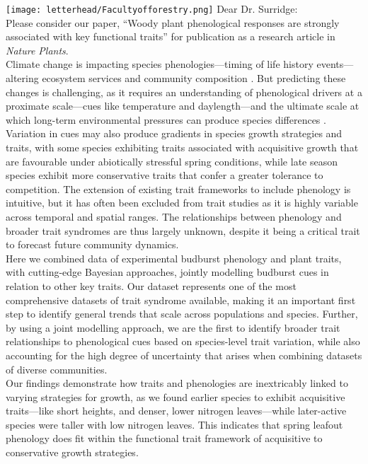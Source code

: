 \documentclass[11pt,a4paper]{article}
\begin{document}

\noindent \texttt{[image: letterhead/Facultyofforestry.png]}
\noindent Dear Dr. Surridge:
\vspace{1.5ex}\\
\noindent Please consider our paper, ``Woody plant phenological responses are strongly associated with key functional traits'' for publication as a research article in \emph{Nature Plants}. 
\vspace{1.5ex}\\ 
\noindent Climate change is impacting species phenologies---timing of life history events---altering ecosystem services and community composition \citep{Cleland2007a,Beard2019,Gu2022}. But predicting these changes is challenging, as it requires an understanding of phenological drivers at a proximate scale---cues like temperature and daylength---and the ultimate scale at which long-term environmental pressures can produce species differences \citep{Ovaskainen2013,Wolkovich2021}.  Variation in cues may also produce gradients in species growth strategies and traits, with some species exhibiting traits associated with acquisitive growth that are favourable under abiotically stressful spring conditions, while late season species exhibit more conservative traits that confer a greater tolerance to competition. The extension of  existing trait frameworks to include phenology is intuitive, but it has often been excluded from trait studies as it is highly variable across temporal and spatial ranges. The relationships between phenology and broader trait syndromes are thus largely unknown, despite it being a critical trait to forecast future community dynamics.
\vspace{1.5ex}\\
\noindent Here we combined data of experimental budburst phenology and plant traits, with cutting-edge Bayesian approaches, jointly modelling budburst cues in relation to other key traits. Our dataset represents one of the most comprehensive datasets of trait syndrome available, making it an important first step to identify general trends that scale across populations and species. Further, by using a joint modelling approach, we are the first to identify broader trait relationships to phenological cues based on species-level trait variation, while also accounting for the high degree of uncertainty that arises when combining datasets of diverse communities.
\vspace{1.5ex}\\
\noindent  Our findings demonstrate how traits and phenologies are inextricably linked to varying strategies for growth, as we found earlier species to exhibit acquisitive traits---like short heights, and denser, lower nitrogen leaves---while later-active species were taller with low nitrogen leaves. This indicates that spring leafout phenology does fit within the functional trait framework of acquisitive to conservative growth strategies.
\end{document}
